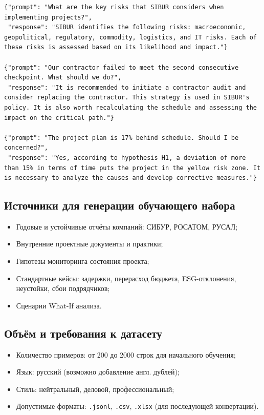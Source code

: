 \documentclass[12pt]{article}
\begin{document}
\begin{lstlisting}
{"prompt": "What are the key risks that SIBUR considers when implementing projects?",
 "response": "SIBUR identifies the following risks: macroeconomic, geopolitical, regulatory, commodity, logistics, and IT risks. Each of these risks is assessed based on its likelihood and impact."}

{"prompt": "Our contractor failed to meet the second consecutive checkpoint. What should we do?",
 "response": "It is recommended to initiate a contractor audit and consider replacing the contractor. This strategy is used in SIBUR's policy. It is also worth recalculating the schedule and assessing the impact on the critical path."}

{"prompt": "The project plan is 17% behind schedule. Should I be concerned?",
 "response": "Yes, according to hypothesis H1, a deviation of more than 15% in terms of time puts the project in the yellow risk zone. It is necessary to analyze the causes and develop corrective measures."}
\end{lstlisting}

\subsection{Источники для генерации обучающего набора}

\begin{itemize}
    \item Годовые и устойчивые отчёты компаний: СИБУР, РОСАТОМ, РУСАЛ;
    \item Внутренние проектные документы и практики;
    \item Гипотезы мониторинга состояния проекта;
    \item Стандартные кейсы: задержки, перерасход бюджета, ESG-отклонения, неустойки, сбои подрядчиков;
    \item Сценарии What-If анализа.
\end{itemize}

\subsection{Объём и требования к датасету}

\begin{itemize}
    \item Количество примеров: от 200 до 2000 строк для начального обучения;
    \item Язык: русский (возможно добавление англ. дублей);
    \item Стиль: нейтральный, деловой, профессиональный;
    \item Допустимые форматы: \texttt{.jsonl}, \texttt{.csv}, \texttt{.xlsx} (для последующей конвертации).
\end{itemize}
\end{document}
